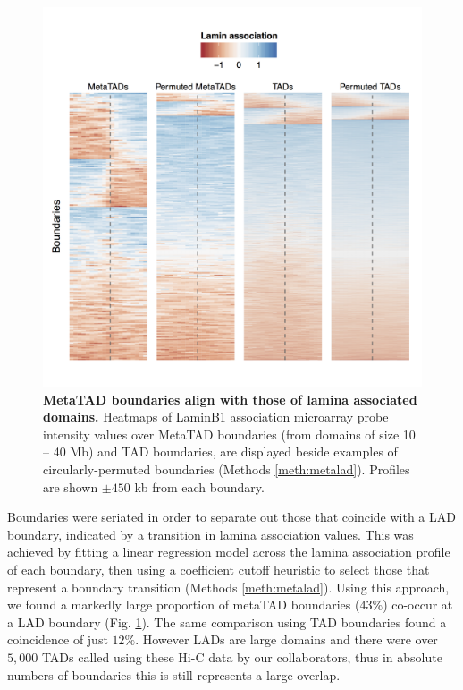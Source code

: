 \documentclass[a4paper,11pt,oneside]{book}
\begin{document}
\begin{figure}
\begin{center} 
\includegraphics[width=4.5in]{mt_laminperm.png}
\captionsetup{width=\textwidth}
\caption[MetaTAD boundaries align with those of lamina associated domains.]{ {\bf MetaTAD boundaries align with those of lamina associated domains.}
Heatmaps of LaminB1 association microarray probe intensity values over MetaTAD boundaries (from domains of size 10 -- 40 Mb) and TAD boundaries, are displayed beside examples of circularly-permuted boundaries (Methods \ref{meth:metalad}). Profiles are shown $\pm450$ kb from each boundary.
}\label{fig:mtlamin}
\end{center}
\end{figure} 

Boundaries were seriated in order to separate out those that coincide with a LAD boundary, indicated by a transition in lamina association values. This was achieved by fitting a linear regression model across the lamina association profile of each boundary, then using a coefficient cutoff heuristic to select those that represent a boundary transition (Methods \ref{meth:metalad}).  Using this approach, we found a markedly large proportion of metaTAD boundaries ($43\%$) co-occur at a LAD boundary (Fig. \ref{fig:mtlamin}). The same comparison using TAD boundaries found a coincidence of just $12\%$. However LADs are large domains and there were over $5,000$ TADs called using these Hi-C data by our collaborators, thus in absolute numbers of boundaries this is still represents a large overlap.
\end{document}
